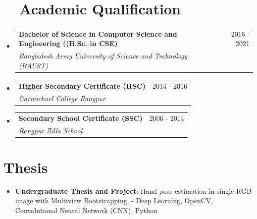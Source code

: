 \documentclass[a4paper]{article}
\makeatletter
\newcommand{\resumeItem}[2]{
  \item\small{
    \textbf{#1}{: #2 \vspace{-2pt}}
  }
}
\newcommand{\resumeSubheading}[4]{
  \vspace{-1pt}\item
    \begin{tabular*}{0.97\textwidth}{l@{\extracolsep{\fill}}r}
      \textbf{#1} & #2 \\
      \textit{#3} & \textit{#4} \\
    \end{tabular*}\vspace{-5pt}
}
\newcommand{\resumeSubItem}[2]{\resumeItem{#1}{#2}\vspace{-3pt}}
\newcommand{\resumeSubHeadingListStart}{\begin{itemize}[leftmargin=*]}
\newcommand{\resumeSubHeadingListEnd}{\end{itemize}}
\makeatother
\begin{document}
\section{~~Academic Qualification}
  \resumeSubHeadingListStart
    \resumeSubheading
      {Bachelor of Science in Computer Science and Engineering ((B.Sc. in CSE) }{2016 - 2021}
      {Bangladesh Army University of Science and Technology (BAUST)}{}
      \vspace{.5pt}
    
    \resumeSubheading
      {Higher Secondary Certificate (HSC)}{2014 - 2016}
      {Carmichael College Rangpur}{}
      \vspace{.5pt}

    \resumeSubheading
      {Secondary School Certificate (SSC)}{2006 - 2014}
      {Rangpur Zilla School}{}
    \resumeSubHeadingListEnd
    \vspace{2pt}





\section{Thesis}
    \resumeSubHeadingListStart
        \resumeSubItem{Undergraduate Thesis and Project}{Hand pose estimation in single RGB image with Multiview Bootstrapping.
        \newline
        - \quad Deep Learning, OpenCV, Convolutional Neural Network (CNN), Python}
    \resumeSubHeadingListEnd
    \vspace{1pt}
\end{document}
